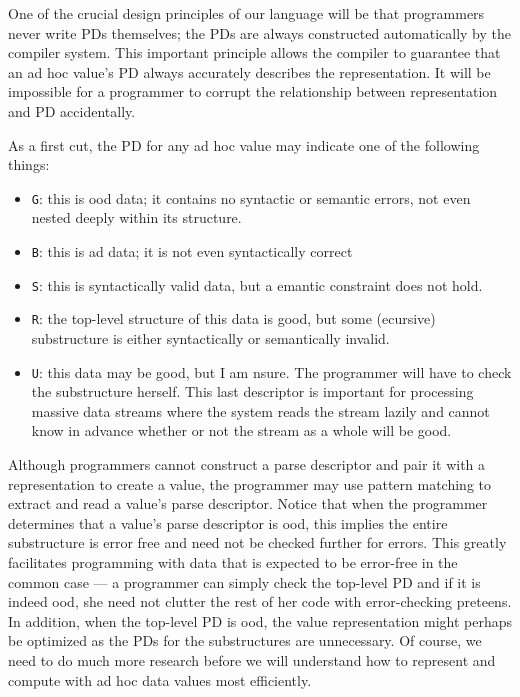 \documentclass[11pt]{article}
\begin{document}
One of the crucial design principles of our language will be
that programmers never write PDs themselves; the
PDs are always constructed automatically by the
compiler system.  This important principle allows the compiler
to guarantee that an ad hoc value's PD always accurately 
describes the representation.
It will be impossible for a programmer to corrupt the relationship
between representation and PD accidentally.  

As a first cut, the PD for any ad hoc
value may indicate one of the following things:
\begin{itemize}
\item {\tt G}: this is ood data; it contains no syntactic or 
semantic errors, not even nested deeply within its structure.
\item {\tt B}: this is ad data; it is not even syntactically correct
\item {\tt S}: this is syntactically valid data, but a emantic 
constraint does not hold.
\item {\tt R}: the top-level structure of this data is good, but some
(ecursive) substructure is either syntactically or semantically invalid.
\item {\tt U}: this data may be good, but I am nsure.  The programmer 
will have to check the substructure herself.  This last descriptor
is important for processing massive data streams where the system reads the
stream lazily and cannot know in advance whether or not the stream
as a whole will be good.
\end{itemize}

\noindent
Although programmers cannot construct a parse descriptor and pair it with a
representation to create a value, the programmer may use pattern matching
to extract and read a value's parse descriptor.  Notice that
when the programmer determines that a value's parse descriptor is
ood, this implies the entire substructure is error free
and need not be checked further for errors.  This 
greatly facilitates programming with data that is expected
to be error-free in the common case ---  a programmer can simply check 
the top-level PD and if it is indeed ood,
she need not clutter the rest of her code with error-checking
preteens.  In addition, when the top-level PD is ood,
the value representation might perhaps be optimized as the
PDs for the substructures are unnecessary.  Of course, we
need to do much more research before we will understand how to 
represent and compute with ad hoc data values most efficiently.
\end{document}
